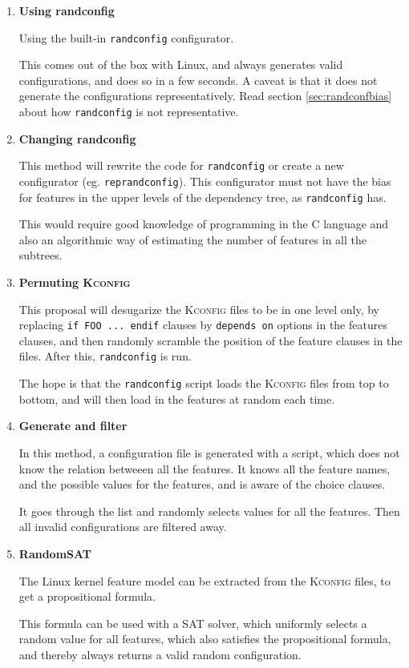 \documentclass[a4paper,11pt]{report}
\newcommand{\textcode}[1]{\fboxsep=1pt\texttt{\colorbox{gray!20}{#1}}}
\begin{document}
\begin{enumerate}

    \item \textbf{Using randconfig}

Using the built-in \texttt{randconfig} configurator.

This comes out of the box with Linux, and always generates valid configurations,
and does so in a few seconds. A caveat is that it does not generate the 
configurations representatively. Read section \ref{sec:randconfbias} about how 
\texttt{randconfig} is not representative.


    \item \textbf{Changing randconfig}

This method will rewrite the code for \texttt{randconfig} or create a new 
configurator (eg. \texttt{reprandconfig}).  This configurator must not have the 
bias for features in the upper levels of the dependency tree, as 
\texttt{randconfig} has.

This would require good knowledge of programming in the \textsc{C} language
and also an algorithmic way of estimating the number of features in all the 
subtrees.


    \item \textbf{Permuting \textsc{Kconfig}}


This proposal will desugarize the \textsc{Kconfig} files to be in one level 
only, by replacing \textcode{if FOO ... endif} clauses by \textcode{depends on} 
options in the features clauses, and then randomly scramble the position of 
the feature clauses in the files. After this, \texttt{randconfig} is run.

The hope is that the \texttt{randconfig} script loads the \textsc{Kconfig} 
files from top to bottom, and will then load in the features at random each 
time.


    \item \textbf{Generate and filter}

            \def \fn {It also is aware about \texttt{choice} clauses}

In this method, a configuration file is generated with a script, which 
does not know the relation betweeen all the features. It knows all the feature
names, and the possible values for the features, and is aware of the choice 
clauses.

It goes through the list and randomly selects values for all the features. Then 
all invalid configurations are filtered away.


    \item \textbf{RandomSAT}

The Linux kernel feature model can be extracted from the \textsc{Kconfig} 
files, to get a propositional formula\cite{lvat}. 

This formula can be used with a SAT solver, which uniformly selects a random
value for all features, which also satisfies the propositional formula, and
thereby always returns a valid random configuration.


    
\end{enumerate}
\end{document}
